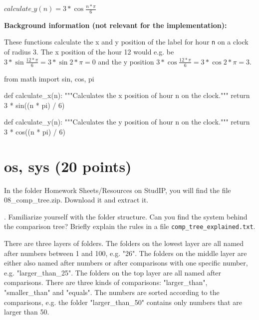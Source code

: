 \noindent $calculate\_y(n) = 3 * \cos{\frac{n * \pi}{6}}$

\vspace{1em}

\noindent \textbf{Background information (not relevant for the implementation):} 

\vspace{1em}

\noindent These functions calculate the x and y position of the label for hour \texttt{n} on a clock of radius 3. The x position of the hour 12 would e.g. be $3 * \sin{\frac{12 * \pi}{6}} = 3 * \sin{2 * \pi} = 0$ and the y position $3 * \cos{\frac{12 * \pi}{6}} = 3 * \cos{2 * \pi} = 3$.

\vspace{1em}

\begin{solution}

\begin{pythoncode}

from math import sin, cos, pi

def calculate_x(n):
    """Calculates the x position of hour n on the clock."""
    return 3 * sin((n * pi) / 6)

def calculate_y(n):
    """Calculates the y position of hour n on the clock."""
    return 3 * cos((n * pi) / 6)

\end{pythoncode}

\end{solution}

\section{os, sys (20 points)}

In the folder Homework Sheets/Resources on StudIP, you will find the file 08\_comp\_tree.zip. Download it and extract it. 

\vspace{1em}

. Familiarize yourself with the folder structure. Can you find the system behind the comparison tree? Briefly explain the rules in a file \texttt{comp\_tree\_explained.txt}.

\vspace{1em}

\begin{solution}

\noindent There are three layers of folders. The folders on the lowest layer are all named after numbers between 1 and 100, e.g. "26". The folders on the middle layer are either also named after numbers or after comparisons with one specific number, e.g. "larger\_than\_25". The folders on the top layer are all named after comparisons. There are three kinds of comparisons: "larger\_than", "smaller\_than" and "equals". \newline The numbers are sorted according to the comparisons, e.g. the folder "larger\_than\_50" contains only numbers that are larger than 50.

\end{solution}


